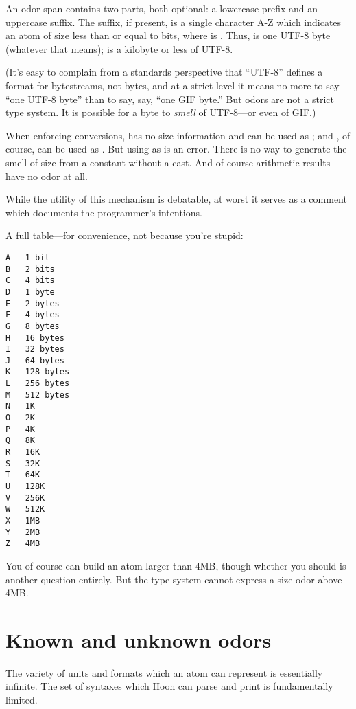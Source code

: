 An odor span contains two parts, both optional: a lowercase
prefix and an uppercase suffix.  The suffix, if present, is a
single character A-Z  which indicates an atom of size less
than or equal to  bits, where  is .
Thus,  is one UTF-8 byte (whatever that means); 
is a kilobyte or less of UTF-8.

(It's easy to complain from a standards perspective that ``UTF-8''
defines a format for bytestreams, not bytes, and at a strict
level it means no more to say ``one UTF-8 byte'' than to say, say,
``one GIF byte.''  But odors are not a strict type system.  It is
possible for a byte to \emph{smell} of UTF-8---or even of GIF.)

When enforcing conversions,  has no size information and can
be used as ; and , of course, can be used as .  But
using  as  is an error.  There is no way to generate
the smell of size from a constant without a cast.  And of course
arithmetic results have no odor at all.

While the utility of this mechanism is debatable, at worst it
serves as a comment which documents the programmer's intentions.

A full table---for convenience, not because you're stupid:

\begin{framed_shaded}
\begin{Verbatim}[fontsize=\relsize{-2.5},fontseries=b,commandchars=\\\{\}]
A   1 bit
B   2 bits
C   4 bits
D   1 byte
E   2 bytes
F   4 bytes
G   8 bytes
H   16 bytes
I   32 bytes
J   64 bytes
K   128 bytes
L   256 bytes
M   512 bytes
N   1K
O   2K
P   4K
Q   8K
R   16K
S   32K
T   64K
U   128K
V   256K
W   512K
X   1MB
Y   2MB
Z   4MB
\end{Verbatim}
\end{framed_shaded}
You of course can build an atom larger than 4MB, though whether
you should is another question entirely.  But the type system
cannot express a size odor above 4MB.

\section{Known and unknown odors}

The variety of units and formats which an atom can represent is
essentially infinite.  The set of syntaxes which Hoon can parse
and print is fundamentally limited.

